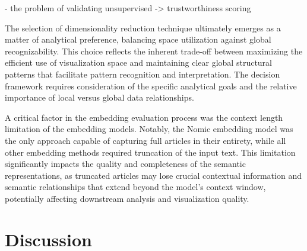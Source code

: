 \begin{table}[h!]
    \centering
    \caption{Evaluation results showing k-nearest neighbor recall (KNN) and correlation of pairwise distances (CPD) scores as described by Kury et al. \cite{kuryDREAMSPreservingBoth2025} for all pipeline configurations.}
    \label{tab:eval-results}
\end{table}

- the problem of validating unsupervised -> trustworthiness scoring

The selection of dimensionality reduction technique ultimately emerges as a matter of analytical preference, balancing space utilization against global recognizability. This choice reflects the inherent trade-off between maximizing the efficient use of visualization space and maintaining clear global structural patterns that facilitate pattern recognition and interpretation. The decision framework requires consideration of the specific analytical goals and the relative importance of local versus global data relationships.

A critical factor in the embedding evaluation process was the context length limitation of the embedding models. Notably, the Nomic embedding model was the only approach capable of capturing full articles in their entirety, while all other embedding methods required truncation of the input text. This limitation significantly impacts the quality and completeness of the semantic representations, as truncated articles may lose crucial contextual information and semantic relationships that extend beyond the model's context window, potentially affecting downstream analysis and visualization quality.

\section{Discussion}
\label{sec:discussion}

